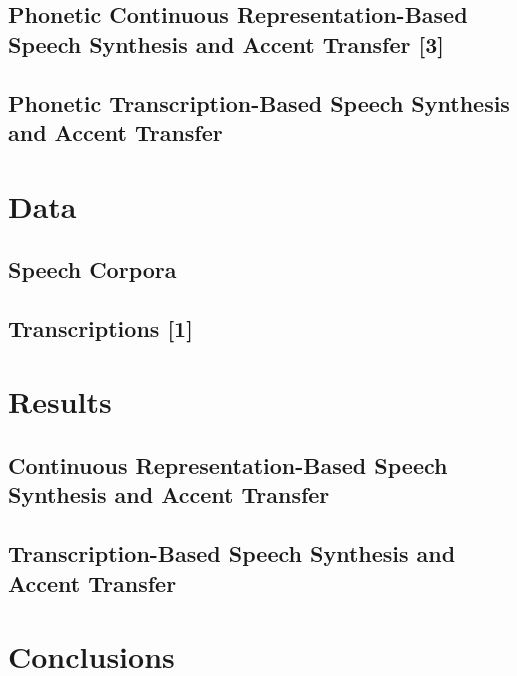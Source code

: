     \subsection{Phonetic Continuous Representation-Based Speech Synthesis and Accent Transfer [3]}
        
    \subsection{Phonetic Transcription-Based Speech Synthesis and Accent Transfer}
        
\section{Data} %
    \subsection{Speech Corpora}
        
    \subsection{Transcriptions [1]}
        
\section{Results} %
    \subsection{Continuous Representation-Based Speech Synthesis and Accent Transfer}
        
    \subsection{Transcription-Based Speech Synthesis and Accent Transfer}
        
\section{Conclusions} %
        
{

}
